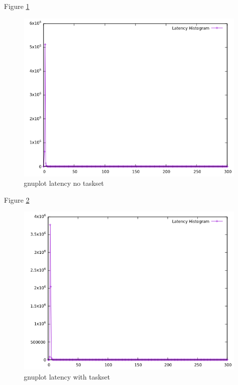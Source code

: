 \documentclass[MMR,Master,english]{twbook}
\begin{document}
Figure \ref{fig:gnuplot_max_max_latency_default}
\begin{figure}[H]
	\centering
	\includegraphics[width=0.8\columnwidth]{masterthesis-documentation/docs/sigmatek/xenomai/default/gnuplot_max_latency_default.png}
	\caption[gnuplot latency no taskset]{gnuplot latency no taskset}
	\label{fig:gnuplot_max_max_latency_default}
\end{figure}

Figure \ref{fig:gnuplot_max_latency_with_taskset}
\begin{figure}[H]
	\centering
	\includegraphics[width=0.8\columnwidth]{masterthesis-documentation/docs/sigmatek/xenomai/with_taskset/gnuplot_max_latency_with_taskset.png}
	\caption[gnuplot latency with taskset]{gnuplot latency with taskset}
	\label{fig:gnuplot_max_latency_with_taskset}
\end{figure}
\end{document}
